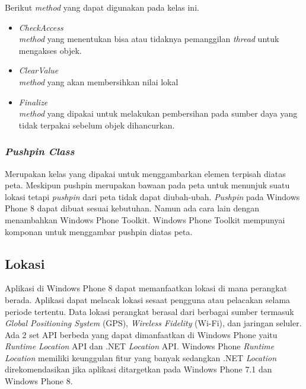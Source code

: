 Berikut \textit{method} yang dapat digunakan pada kelas ini.
\begin{itemize}
	\item \textit{CheckAccess}\\
	\textit{method} yang menentukan bisa atau tidaknya pemanggilan \textit{thread} untuk mengakses objek.
	\item \textit{ClearValue}\\
	\textit{method} yang akan membersihkan nilai lokal
	\item \textit{Finalize} \\
	\textit{method} yang dipakai untuk melakukan pembersihan pada sumber daya yang tidak terpakai sebelum objek dihancurkan.
\end{itemize}

\subsubsection{\textit{Pushpin Class}}
\label{subsubsec:Pushpin Class}
\hspace{0.5cm} Merupakan kelas yang dipakai untuk menggambarkan elemen terpisah diatas peta. Meskipun pushpin merupakan bawaan pada peta untuk menunjuk suatu lokasi tetapi \textit{pushpin} dari peta tidak dapat diubah-ubah. \textit{Pushpin} pada Windows Phone 8 dapat dibuat sesuai kebutuhan. Namun ada cara lain dengan menambahkan Windows Phone Toolkit. Windows Phone Toolkit mempunyai komponan untuk menggambar pushpin diatas peta.  

\subsection{Lokasi}
\label{subsec:Lokasi}
\hspace{0.5cm} Aplikasi di Windows Phone 8 dapat memanfaatkan lokasi di mana perangkat berada. Aplikasi dapat melacak lokasi sesaat  pengguna atau pelacakan selama periode tertentu. Data lokasi perangkat berasal dari berbagai sumber termasuk \textit{Global Positioning System} (GPS), \textit{Wireless Fidelity} (Wi-Fi), dan jaringan seluler. Ada 2 set API berbeda yang dapat dimanfaatkan di Windows Phone yaitu \textit{Runtime Location} API dan .NET \textit{Location} API. Windows Phone \textit{Runtime Location} memiliki keunggulan fitur yang banyak sedangkan .NET \textit{Location} direkomendasikan jika aplikasi ditargetkan pada Windows Phone 7.1 dan Windows Phone 8\cite{MSDN}.

